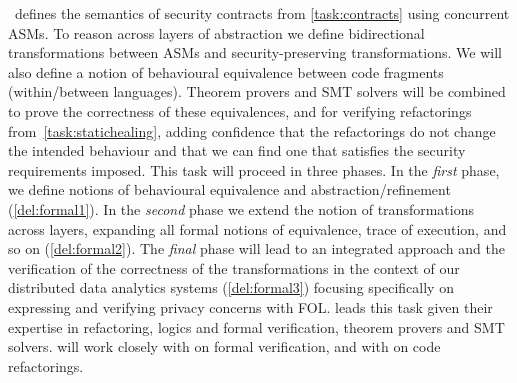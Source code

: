 \begin{Workpackage}{\thewpno}
\begin{Task}
\theTask\ defines the semantics of security contracts from \ref{task:contracts} using concurrent ASMs. To reason across layers of abstraction we define %
 bidirectional transformations between ASMs %
and security-preserving transformations. We will also define a notion of behavioural equivalence between code fragments (within/between languages). Theorem provers and SMT solvers will be combined to prove the correctness of these equivalences, and for verifying refactorings
from~\ref{task:statichealing}, adding confidence that the refactorings do not change the intended behaviour and 
\taskbreak 
that we can find one that satisfies the security requirements imposed. 
This task will proceed in three phases. In the \emph{first} phase, we define notions of behavioural equivalence and abstraction/refinement 
(\ref{del:formal1}). In the \emph{second} phase we extend the notion of transformations across layers, expanding all formal notions of equivalence, trace of execution, and so on
(\ref{del:formal2}). The \emph{final} phase will lead to an integrated approach and the verification of the correctness of the transformations in the context of our distributed data analytics systems (\ref{del:formal3}) focusing specifically on expressing and verifying privacy concerns with FOL.
\SA leads this task given their expertise in refactoring, logics and formal verification, theorem provers and SMT solvers. 
\SA will work closely with \SCCHshort on formal verification, and with \UCM on code refactorings.

\end{Task}


\end{Workpackage}
